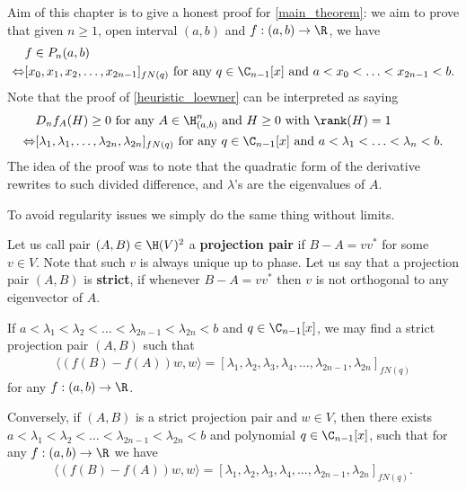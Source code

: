 Aim of this chapter is to give a honest proof for \ref{main_theorem}: we aim to prove that given $n \geq 1$, open interval $(a, b)$ and $f : (a, b) \to \R$, we have 
\begin{align*}
	& f \in P_{n}(a, b) \\
	\Leftrightarrow &[x_{0}, x_{1}, x_{2}, \ldots, x_{2 n - 1}]_{f N(q)} \text{ for any $q \in \C_{n - 1}[x]$ and $a < x_{0} < \ldots < x_{2 n - 1} < b$}.
\end{align*}
Note that the proof of \ref{heuristic_loewner} can be interpreted as saying
\begin{align*}
	& D_{n} f_{A}(H) \geq 0 \text{ for any $A \in \H^{n}_{(a, b)}$ and $H \geq 0$ with $\rank(H) = 1$} \\
	\Leftrightarrow &[\lambda_{1}, \lambda_{1}, \ldots, \lambda_{2 n}, \lambda_{2 n}]_{f N(q)} \text{ for any $q \in \C_{n - 1}[x]$ and $a < \lambda_{1} < \ldots < \lambda_{n} < b$}.
\end{align*}
The idea of the proof was to note that the quadratic form of the derivative rewrites to such divided difference, and $\lambda$'s are the eigenvalues of $A$.

To avoid regularity issues we simply do the same thing without limits.

\begin{maar}
	Let us call pair $(A, B) \in \H(V)^{2}$ a \textbf{projection pair} if $B - A = v v^{*}$ for some $v \in V$. Note that such $v$ is always unique up to phase. Let us say that a projection pair $(A, B)$ is \textbf{strict}, if whenever $B - A = v v^{*}$ then $v$ is not orthogonal to any eigenvector of $A$. 
\end{maar}

\begin{lem}\label{main_lemma}
	If $a < \lambda_{1} < \lambda_{2} < \ldots < \lambda_{2 n - 1} < \lambda_{2 n} < b$ and $q \in \C_{n - 1}[x]$, we may find a strict projection pair $(A, B)$ such that
	\begin{align*}
		\langle (f(B) - f(A)) w, w \rangle = [\lambda_{1}, \lambda_{2}, \lambda_{3}, \lambda_{4}, \ldots, \lambda_{2n - 1}, \lambda_{2 n}]_{f N(q)}
	\end{align*}
	for any $f : (a, b) \to \R$.

	Conversely, if $(A, B)$ is a strict projection pair and $w \in V$, then there exists $a < \lambda_{1} < \lambda_{2} < \ldots < \lambda_{2 n - 1} < \lambda_{2 n} < b$ and polynomial $q \in \C_{n - 1}[x]$, such that for any $f : (a, b) \to \R$ we have
	\begin{align*}
		\langle (f(B) - f(A)) w, w \rangle = [\lambda_{1}, \lambda_{2}, \lambda_{3}, \lambda_{4}, \ldots, \lambda_{2n - 1}, \lambda_{2 n}]_{f N(q)}.
	\end{align*}
\end{lem}

